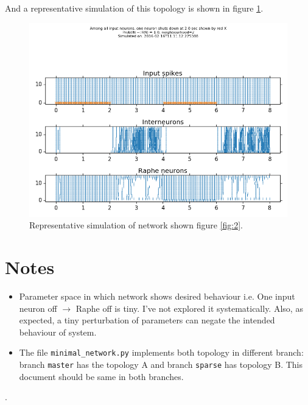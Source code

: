 \documentclass[]{article}
\begin{document}
And a representative simulation of this topology is shown in figure
\ref{fig:simulation2}.

\begin{figure}[ht!]
\begin{center}
    \includegraphics[width=1\textwidth]{./_snapshots/minimal_network.png}
\end{center}
\caption{Representative simulation of network shown figure \ref{fig:2}.}
\label{fig:simulation2}
\end{figure}

\section{Notes}
\label{sec:notes}

\begin{itemize}
    \item Parameter space in which network shows desired behaviour i.e. One
        input neuron off $\rightarrow$ Raphe off is tiny. I've not explored it
        systematically. Also, as expected, a tiny perturbation of parameters can
        negate the intended behaviour of system.
    \item The file \texttt{minimal\_network.py} implements both topology in
        different branch: branch \texttt{master} has the topology A and branch
        \texttt{sparse} has topology B. This document should be same in both
        branches. 
\end{itemize}
. 
\end{document}
